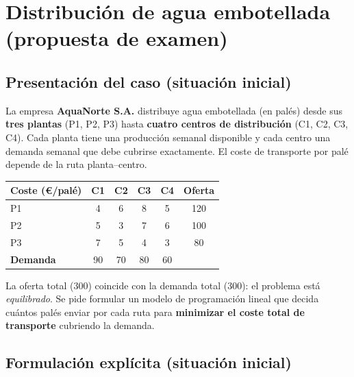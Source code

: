 \section{Distribución de agua embotellada (propuesta de examen)}


\subsection{Presentación del caso (situación inicial)}
La empresa \textbf{AquaNorte S.A.} distribuye agua embotellada (en palés) desde sus \textbf{tres plantas} (P1, P2, P3) hasta \textbf{cuatro centros de distribución} (C1, C2, C3, C4). Cada planta tiene una producción semanal disponible y cada centro una demanda semanal que debe cubrirse exactamente. El coste de transporte por palé depende de la ruta planta--centro.

\begin{center}
\begin{tabular}{lccccc}
\toprule
\textbf{Coste (€/palé)} & \textbf{C1} & \textbf{C2} & \textbf{C3} & \textbf{C4} & \textbf{Oferta}\\
\midrule
P1 & 4 & 6 & 8 & 5 & 120\\
P2 & 5 & 3 & 7 & 6 & 100\\
P3 & 7 & 5 & 4 & 3 & 80\\
\midrule
\textbf{Demanda} & 90 & 70 & 80 & 60 & \\
\bottomrule
\end{tabular}
\end{center}

La oferta total (300) coincide con la demanda total (300): el problema está \emph{equilibrado}. Se pide formular un modelo de programación lineal que decida cuántos palés enviar por cada ruta para \textbf{minimizar el coste total de transporte} cubriendo la demanda.

\subsection{Formulación explícita (situación inicial)}

